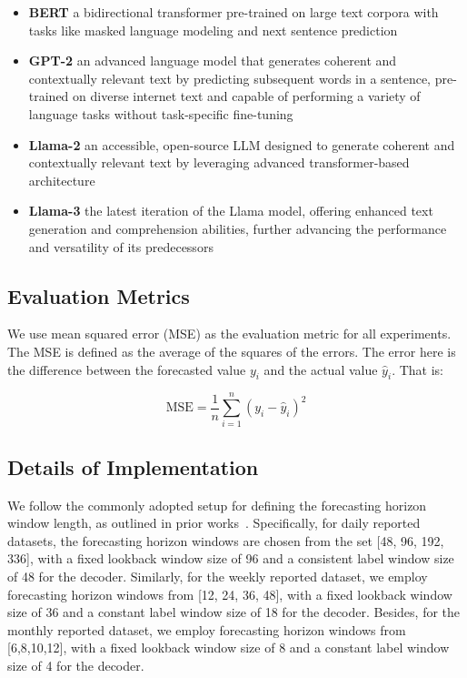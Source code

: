 \begin{itemize}
    \item \textbf{BERT} a bidirectional transformer pre-trained on large text corpora with tasks like masked language modeling and next sentence prediction
    \item \textbf{GPT-2} an advanced language model that generates coherent and contextually relevant text by predicting subsequent words in a sentence, pre-trained on diverse internet text and capable of performing a variety of language tasks without task-specific fine-tuning
    \item \textbf{Llama-2} an accessible, open-source LLM designed to generate coherent and contextually relevant text by leveraging advanced transformer-based architecture 
    \item \textbf{Llama-3} the latest iteration of the Llama model, offering enhanced text generation and comprehension abilities, further advancing the performance and versatility of its predecessors
\end{itemize}

\subsection{Evaluation Metrics}\label{sec:metrics}
We use mean squared error (MSE) as the evaluation metric for all experiments. The MSE is defined as the average of the squares of the errors. The error here is the difference between the forecasted value $y_i$ and the actual value $\hat{y}_i$. That is:

\begin{equation}
\text{MSE} = \frac{1}{n} \sum_{i=1}^{n} (y_i - \hat{y}_i)^2
\end{equation}

\subsection{Details of Implementation}
We follow the commonly adopted setup for defining the forecasting horizon window length, as outlined in prior works~\cite{wu2021autoformer,wu2023timesnet,nie2022time}. Specifically, for daily reported datasets, the forecasting horizon windows are chosen from the set [48, 96, 192, 336], with a fixed lookback window size of 96 and a consistent label window size of 48 for the decoder. Similarly, for the weekly reported dataset, we employ forecasting horizon windows from [12, 24, 36, 48], with a fixed lookback window size of 36 and a constant label window size of 18 for the decoder. Besides, for the monthly reported dataset, we employ forecasting horizon windows from [6,8,10,12], with a fixed lookback window size of 8 and a constant label window size of 4 for the decoder. 

